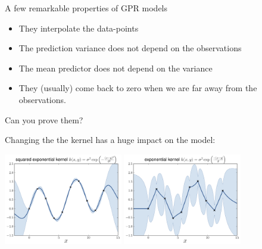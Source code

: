\documentclass{beamer}
\begin{document}
\begin{frame}{}
A few remarkable properties of GPR models 
\begin{itemize}
	\item They interpolate the data-points
	\item The prediction variance does not depend on the observations
	\item The mean predictor does not depend on the variance
	\item They (usually) come back to zero when we are far away from the observations.
\end{itemize}
Can you prove them?
\end{frame}


\begin{frame}{}
Changing the the kernel \alert{has a huge impact on the model}:\\ 
\begin{center}
\includegraphics[height=4cm]{figures/R/Fig2-GP-rbf} 
\includegraphics[height=4cm]{figures/R/Fig2-GP-exp}
\end{center}
\end{frame}
\end{document}
